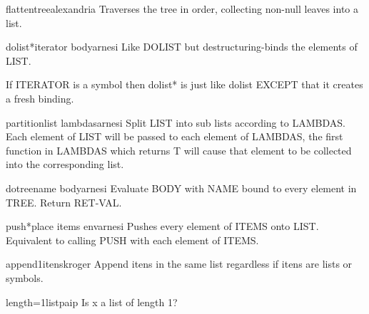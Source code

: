 \begin{function}{flatten}{tree}{alexandria}{}
  Traverses the tree in order, collecting non-null leaves into a list.
\end{function}

\begin{macro}{dolist*}{iterator \body body}{arnesi}{}
  Like DOLIST but destructuring-binds the elements of LIST.

If ITERATOR is a symbol then dolist* is just like dolist EXCEPT
that it creates a fresh binding.
\end{macro}

\begin{function}{partition}{list \rest lambdas}{arnesi}{}
  Split LIST into sub lists according to LAMBDAS. Each element of LIST
  will be passed to each element of LAMBDAS, the first function in
  LAMBDAS which returns T will cause that element to be collected into
  the corresponding list.
\end{function}

\begin{macro}{dotree}{name \body body}{arnesi}{}
  Evaluate BODY with NAME bound to every element in TREE. Return RET-VAL.
\end{macro}

\begin{macro}{push*}{place \rest items \env env}{arnesi}{}
  Pushes every element of ITEMS onto LIST. Equivalent to calling PUSH
  with each element of ITEMS.
\end{macro}

\begin{function}{append1}{\rest itens}{kroger}{}
  Append itens in the same list regardless if itens are lists or
  symbols.
\end{function}

\begin{function}{length=1}{list}{paip}{}
  Is x a list of length 1?
\end{function}


